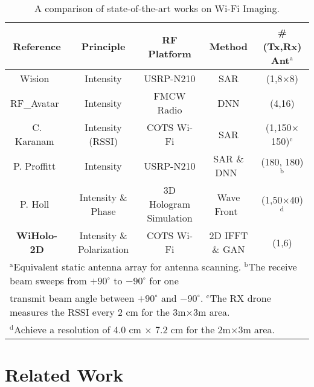 \begin{table*}[t]
    \caption{A comparison of state-of-the-art works on Wi-Fi Imaging.}
    \vspace{2mm}
    \begin{center}
    \begin{tabular}{ccccc}
    \hline
     Reference  & Principle &  RF Platform & Method & \#(Tx,Rx) Ant$^{\mathrm{a}}$\\ 
    \hline
    Wision~\cite{wision}  & Intensity & USRP-N210 & SAR & (1,8$\times$8)\\ 
    RF\_Avatar~\cite{rf_avatar}  & Intensity & FMCW Radio & DNN & (4,16)\\ 
    C. Karanam~\cite{3dimaging_uav} & Intensity (RSSI) & COTS Wi-Fi & SAR & (1,150$\times$150)$^{\mathrm{c}}$\\ 
    P. Proffitt~\cite{imaging_1} & Intensity & USRP-N210 & SAR \& DNN~\cite{MaskRCNN} & (180, 180)$^{\mathrm{b}}$\\ 
    P. Holl~\cite{holography} & Intensity \& Phase & 3D Hologram Simulation & Wave Front~\cite{angular} & (1,50$\times$40)$^{\mathrm{d}}$\\ 
    \hline
    \textbf{\textsf{WiHolo-2D}} & Intensity \& Polarization & COTS Wi-Fi & 2D IFFT \& GAN &(1,6) \\
    \hline
    \multicolumn{5}{l}{$^{\mathrm{a}}$Equivalent static antenna array for antenna scanning. $^{\mathrm{b}} $The receive beam sweeps from $+90^{\circ}$ to $-90^{\circ}$ for one}\\
    \multicolumn{5}{l}{transmit beam angle between $+90^{\circ}$ and $-90^{\circ}$. $^{\mathrm{c}}$The RX drone measures the RSSI every 2 cm for the 3m$\times$3m area.}\\
    \multicolumn{5}{l}{$^{\mathrm{d}}$Achieve a resolution of 4.0 cm $\times$ 7.2 cm for the 2m$\times$3m area.}\\
    \end{tabular}
    \label{comparison}
    \end{center}
\end{table*}

\section{Related Work}
\label{sec-related-work}

